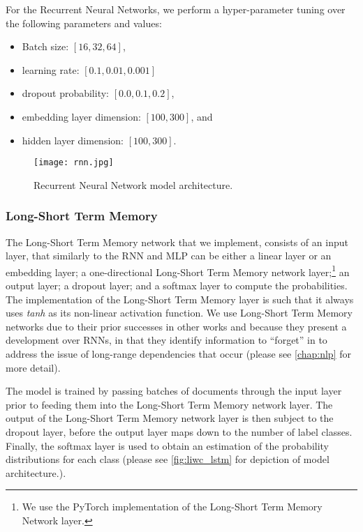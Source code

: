 For the Recurrent Neural Networks, we perform a hyper-parameter tuning over the following parameters and values:

\begin{itemize}
  \item Batch size: $[16, 32, 64]$,
  \item learning rate: $[0.1, 0.01, 0.001]$
  \item dropout probability: $[0.0, 0.1, 0.2]$,
  \item embedding layer dimension: $[100, 300]$, and
  \item hidden layer dimension: $[100, 300]$.
\end{itemize}

\begin{figure}
  \centering
  \texttt{[image: rnn.jpg]}
  \caption{Recurrent Neural Network model architecture.}
  \label{fig:liwc_rnn}
\end{figure}

\subsubsection{Long-Short Term Memory}

The Long-Short Term Memory network that we implement, consists of an input layer, that similarly to the RNN and MLP can be either a linear layer or an embedding layer; a one-directional Long-Short Term Memory network layer;\footnote{We use the PyTorch implementation of the Long-Short Term Memory Network layer.} an output layer; a dropout layer; and a softmax layer to compute the probabilities. The implementation of the Long-Short Term Memory layer is such that it always uses \textit{tanh} as its non-linear activation function. We use Long-Short Term Memory networks due to their prior successes in other works \cite{CITE: LSTM papers} and because they present a development over RNNs, in that they identify information to ``forget'' in to address the issue of long-range dependencies that occur (please see \autoref{chap:nlp} for more detail).

The model is trained by passing batches of documents through the input layer prior to feeding them into the Long-Short Term Memory network layer. The output of the Long-Short Term Memory network layer is then subject to the dropout layer, before the output layer maps down to the number of label classes. Finally, the softmax layer is used to obtain an estimation of the probability distributions for each class (please see \autoref{fig:liwc_lstm} for depiction of model architecture.).

